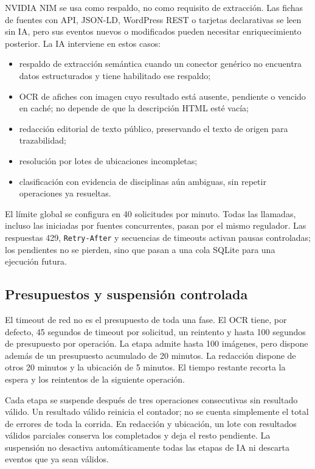 \documentclass[11pt,a4paper]{article}
\begin{document}
NVIDIA NIM se usa como respaldo, no como requisito de extracci\'{o}n. Las fichas de fuentes con API, JSON-LD, WordPress REST o tarjetas declarativas se leen sin IA, pero sus eventos nuevos o modificados pueden necesitar enriquecimiento posterior. La IA interviene en estos casos:
\begin{itemize}
  \item respaldo de extracci\'{o}n sem\'{a}ntica cuando un conector gen\'{e}rico no encuentra datos estructurados y tiene habilitado ese respaldo;
  \item OCR de afiches con imagen cuyo resultado est\'{a} ausente, pendiente o vencido en cach\'{e}; no depende de que la descripci\'{o}n HTML est\'{e} vac\'{i}a;
  \item redacci\'{o}n editorial de texto p\'{u}blico, preservando el texto de origen para trazabilidad;
  \item resoluci\'{o}n por lotes de ubicaciones incompletas;
  \item clasificaci\'{o}n con evidencia de disciplinas a\'{u}n ambiguas, sin repetir operaciones ya resueltas.
\end{itemize}

El l\'{i}mite global se configura en 40 solicitudes por minuto. Todas las llamadas, incluso las iniciadas por fuentes concurrentes, pasan por el mismo regulador. Las respuestas 429, \texttt{Retry-After} y secuencias de timeouts activan pausas controladas; los pendientes no se pierden, sino que pasan a una cola SQLite para una ejecuci\'{o}n futura.

\subsection{Presupuestos y suspensi\'{o}n controlada}

El timeout de red no es el presupuesto de toda una fase. El OCR tiene, por defecto, 45 segundos de timeout por solicitud, un reintento y hasta 100 segundos de presupuesto por operaci\'{o}n. La etapa admite hasta 100 im\'{a}genes, pero dispone adem\'{a}s de un presupuesto acumulado de 20 minutos. La redacci\'{o}n dispone de otros 20 minutos y la ubicaci\'{o}n de 5 minutos. El tiempo restante recorta la espera y los reintentos de la siguiente operaci\'{o}n.

Cada etapa se suspende despu\'{e}s de tres operaciones consecutivas sin resultado v\'{a}lido. Un resultado v\'{a}lido reinicia el contador; no se cuenta simplemente el total de errores de toda la corrida. En redacci\'{o}n y ubicaci\'{o}n, un lote con resultados v\'{a}lidos parciales conserva los completados y deja el resto pendiente. La suspensi\'{o}n no desactiva autom\'{a}ticamente todas las etapas de IA ni descarta eventos que ya sean v\'{a}lidos.
\end{document}

